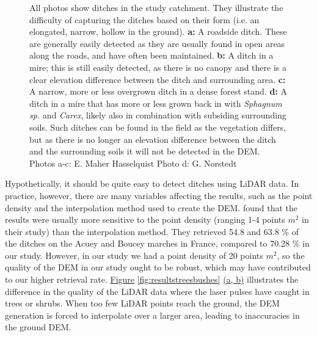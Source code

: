\documentclass[]{interact}
\theoremstyle{plain}%
\theoremstyle{definition}
\theoremstyle{remark}
\begin{document}
\begin{figure} [!htb]
    \caption{All photos show ditches in the study catchment. They illustrate the difficulty of capturing the ditches based on their form (i.e. an elongated, narrow, hollow in the ground). \textbf{a: }A roadside ditch. These are generally easily detected as they are usually found in open areas along the roads, and have often been maintained. \textbf{b: }A ditch in a mire; this is still easily detected, as there is no canopy and there is a clear elevation difference between the ditch and surrounding area. \textbf{c: }A narrow, more or less  overgrown ditch in a dense forest stand. \textbf{d: }A ditch in a mire that has more or less grown back in with \textit{Sphagnum sp.} and \textit{Carex}, likely also in combination with subsiding surrounding soils. Such ditches can be found in the field as the vegetation differs, but as there is no longer an elevation difference between the ditch and the surrounding soils it will not be detected in the DEM. Photos a-c: E. Maher Hasselquist  Photo d: G. Norstedt}
    \label{fig:ditchpictures}
\end{figure}

Hypothetically, it should be quite easy to detect ditches using LiDAR data. In practice, however, there are many variables affecting the results, such as the point density and the interpolation method used to create the DEM. \citet{rapinel} found that the results were usually more sensitive to the point density (ranging 1-4 points $m^{2}$ in their study) than the interpolation method. They retrieved 54.8 and 63.8 \% of the ditches on the Acuey and Boucey marches in France, compared to 70.28 \% in our study. However, in our study we had a point density of 20 points $m^{2}$, so the quality of the DEM in our study ought to be robust, which may have contributed to our higher retrieval rate. \hyperref[fig:resultstreesbushes]{Figure} \ref{fig:resultstreesbushes} \hyperref[fig:resultstreesbushes]{(a, b)} illustrates the difference in the quality of the LiDAR data where the laser pulses have caught in trees or shrubs. When too few LiDAR points reach the ground, the DEM generation is forced to interpolate over a larger area, leading to inaccuracies in the ground DEM.
\end{document}
